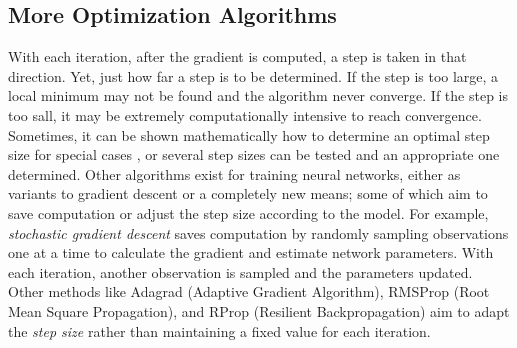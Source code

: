 \subsection{More Optimization Algorithms}

With each iteration, after the gradient is computed, a step is taken in that direction.  Yet, just how far a step is to be determined.  If the step is too large, a local minimum may not be found and the algorithm never converge.  If the step is too sall, it may be extremely computationally intensive to reach convergence.  Sometimes, it can be shown mathematically how to determine an optimal step size for special cases \cite{nar2018step}, or several step sizes can be tested \cite{Goodfellow-et-al-2016} and an appropriate one determined.  Other algorithms exist for training neural networks, either as variants to gradient descent or a completely new means; some of which aim to save computation or adjust the step size according to the model.  For example, \textit{stochastic gradient descent} saves computation by randomly sampling observations one at a time to calculate the gradient and estimate network parameters.  With each iteration, another observation is sampled and the parameters updated.  Other methods like Adagrad (Adaptive Gradient Algorithm), RMSProp (Root Mean Square Propagation), and RProp (Resilient Backpropagation)\cite{rproprprop} aim to adapt the \textit{step size} rather than maintaining a fixed value for each iteration.